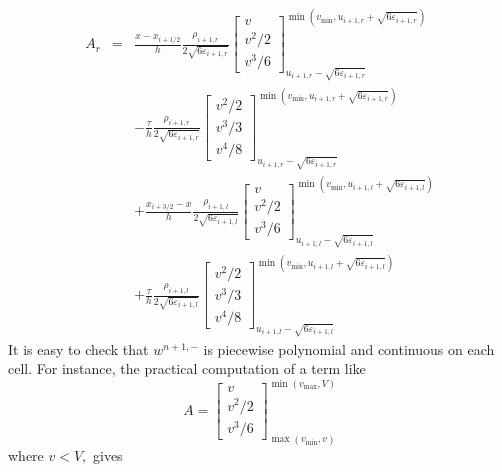 \documentclass{fldauth}
\theoremstyle{plain}
\theoremstyle{plain}
\theoremstyle{plain}
\theoremstyle{plain}
\theoremstyle{plain}
\theoremstyle{plain}
\begin{document}
\begin{eqnarray*}
A_{r} & = & \frac{x-x_{i+1/2}}{h}\frac{\rho _{i+1,r}}{2\sqrt{6\varepsilon _{i+1,r}}}\left[ \begin{array}{c}
v\\
v^{2}/2\\
v^{3}/6
\end{array}\right] _{u_{i+1,r}-\sqrt{6\varepsilon _{i+1,r}}}^{\min (v_{\min },u_{i+1,r}+\sqrt{6\varepsilon _{i+1,r}})}\\
 &  & -\frac{\tau }{h}\frac{\rho _{i+1,r}}{2\sqrt{6\varepsilon _{i+1,r}}}\left[ \begin{array}{c}
v^{2}/2\\
v^{3}/3\\
v^{4}/8
\end{array}\right] _{u_{i+1,r}-\sqrt{6\varepsilon _{i+1,r}}}^{\min (v_{\min },u_{i+1,r}+\sqrt{6\varepsilon _{i+1,r}})}\\
 &  & +\frac{x_{i+3/2}-x}{h}\frac{\rho _{i+1,l}}{2\sqrt{6\varepsilon _{i+1,l}}}\left[ \begin{array}{c}
v\\
v^{2}/2\\
v^{3}/6
\end{array}\right] _{u_{i+1,l}-\sqrt{6\varepsilon _{i+1,l}}}^{\min (v_{\min },u_{i+1,l}+\sqrt{6\varepsilon _{i+1,l}})}\\
 &  & +\frac{\tau }{h}\frac{\rho _{i+1,l}}{2\sqrt{6\varepsilon _{i+1,l}}}\left[ \begin{array}{c}
v^{2}/2\\
v^{3}/3\\
v^{4}/8
\end{array}\right] _{u_{i+1,l}-\sqrt{6\varepsilon _{i+1,l}}}^{\min (v_{\min },u_{i+1,l}+\sqrt{6\varepsilon _{i+1,l}})}
\end{eqnarray*}
 It is easy to check that \( w^{n+1,-} \) is piecewise polynomial and continuous
on each cell. For instance, the practical computation of a term like
\[
A=\left[ \begin{array}{c}
v\\
v^{2}/2\\
v^{3}/6
\end{array}\right] _{\max (v_{\min },v)}^{\min (v_{\max },V)}\]
 where \( v<V, \) gives
\end{document}
